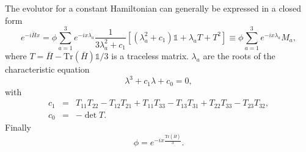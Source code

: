 \documentclass[11pt,a4paper]{article}
\begin{document}
The evolutor for a constant Hamiltonian can generally be expressed in a closed form~\cite{Ohlsson:1999xb}
\begin{equation}
	e^{- i \bar{H} x} = \phi \sum_{a=1}^3 e^{-i x \lambda_a} \frac{1}{3\lambda_a^2 + c_1}\left[ \left(\lambda_a^2 + c_1\right) \mathbb{1} + \lambda_a T + T^2 \right] \equiv \phi \sum_{a=1}^3 e^{-i x \lambda_a} M_a,
\end{equation}
where $T = \bar{H} - \text{Tr}(\bar{H}) \mathbb{1}/3 $ is a traceless matrix. $\lambda_a$ are the roots of the characteristic equation
\begin{equation}
	\lambda^3 + c_1 \lambda + c_0 = 0,
\end{equation}
with
\begin{eqnarray}
	c_1 &=& T_{11} T_{22} - T_{12} T_{21} + T_{11} T_{33} - T_{13} T_{31}
+ T_{22} T_{33} - T_{23} T_{32}, \\
c_0 &=& - \det T.
\end{eqnarray}
Finally
\begin{equation}
	\phi = e^{- i x \frac{\text{Tr}(\bar{H})}{3} }.
\end{equation}

\end{document}
